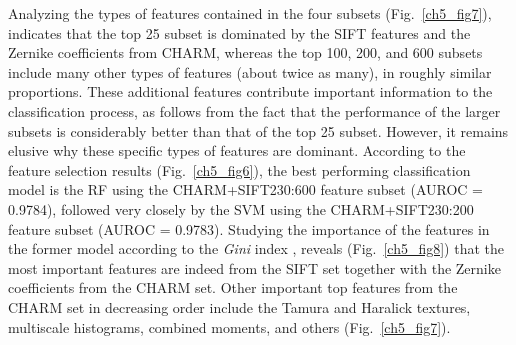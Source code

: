 Analyzing the types of features contained in the four subsets (Fig.~\ref{ch5_fig7}), indicates that the top 25 subset is dominated by the SIFT features and the Zernike coefficients from CHARM, whereas the top 100, 200, and 600 subsets include many other types of features (about twice as many), in roughly similar proportions. These additional features contribute important information to the classification process, as follows from the fact that the performance of the larger subsets is considerably better than that of the top 25 subset. However, it remains elusive why these specific types of features are dominant. According to the feature selection results (Fig.~\ref{ch5_fig6}), the best performing classification model is the RF using the CHARM+SIFT230:600 feature subset (AUROC = 0.9784), followed very closely by the SVM using the CHARM+SIFT230:200 feature subset (AUROC = 0.9783). Studying the importance of the features in the former model according to the \textit{Gini} index \cite{breiman2001random}, reveals (Fig.~\ref{ch5_fig8}) that the most important features are indeed from the SIFT set together with the Zernike coefficients from the CHARM set. Other important top features from the CHARM set in decreasing order include the Tamura and Haralick textures, multiscale histograms, combined moments, and others (Fig.~\ref{ch5_fig7}).
